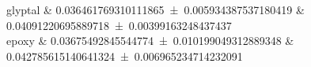 glyptal 		&		\num{0.036461769310111865 \pm 0.005934387537180419} 		&		\num{0.04091220695889718 \pm 0.00399163248437437}	 \\ 
epoxy 		&		\num{0.03675492845544774 \pm 0.010199049312889348} 		&		\num{0.042785615140641324 \pm 0.006965234714232091}	 \\ 
